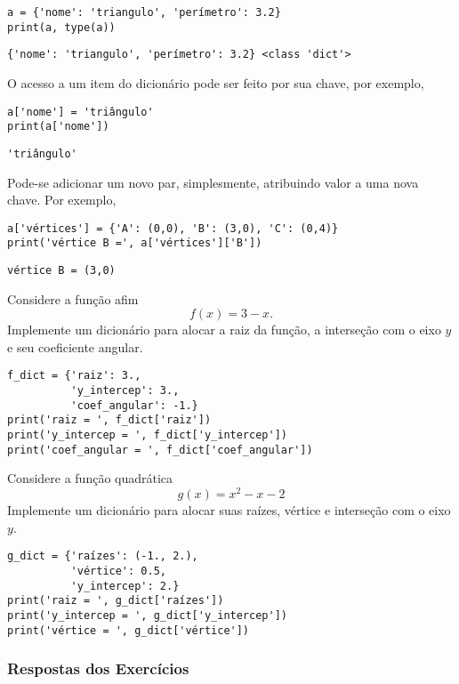 \begin{lstlisting}
a = {'nome': 'triangulo', 'perímetro': 3.2}
print(a, type(a))
\end{lstlisting}

\begin{verbatim}
{'nome': 'triangulo', 'perímetro': 3.2} <class 'dict'>
\end{verbatim}


O acesso a um item do dicionário pode ser feito por sua chave, por exemplo,

\begin{lstlisting}
a['nome'] = 'triângulo'
print(a['nome'])
\end{lstlisting}

\begin{verbatim}
'triângulo'
\end{verbatim}

Pode-se adicionar um novo par, simplesmente, atribuindo valor a uma nova chave. Por exemplo,

\begin{lstlisting}
a['vértices'] = {'A': (0,0), 'B': (3,0), 'C': (0,4)}
print('vértice B =', a['vértices']['B'])
\end{lstlisting}

\begin{verbatim}
vértice B = (3,0)
\end{verbatim}


\begin{exer}
  Considere a função afim
  \begin{equation}
    f(x) = 3 - x.
  \end{equation}
  Implemente um dicionário para alocar a raiz da função, a interseção com o eixo $y$ e seu coeficiente angular.
\end{exer}
\begin{resp}

\begin{lstlisting}
f_dict = {'raiz': 3.,
          'y_intercep': 3.,
          'coef_angular': -1.}
print('raiz = ', f_dict['raiz'])
print('y_intercep = ', f_dict['y_intercep'])
print('coef_angular = ', f_dict['coef_angular'])
\end{lstlisting}

\end{resp}

\begin{exer}
  Considere a função quadrática
  \begin{equation}
    g(x) = x^2 - x - 2
  \end{equation}
  Implemente um dicionário para alocar suas raízes, vértice e interseção com o eixo $y$.
\end{exer}
\begin{resp}

\begin{lstlisting}
g_dict = {'raízes': (-1., 2.),
          'vértice': 0.5,
          'y_intercep': 2.}
print('raiz = ', g_dict['raízes'])
print('y_intercep = ', g_dict['y_intercep'])
print('vértice = ', g_dict['vértice'])
\end{lstlisting}

\end{resp}

\ifisbook 
\subsubsection*{Respostas dos Exercícios}
\shipoutAnswer
\fi
